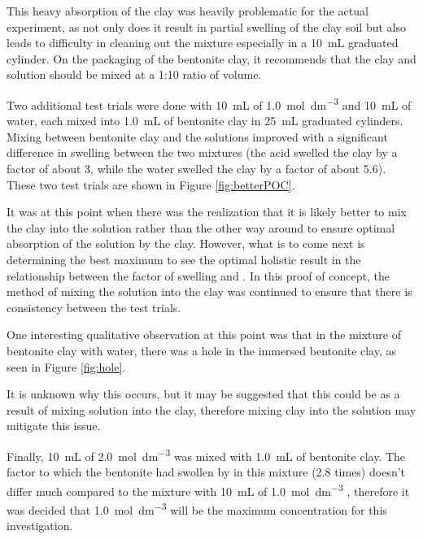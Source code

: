 \documentclass[11pt, letterpaper]{article}
\begin{document}
This heavy absorption of the clay was heavily problematic
for the actual experiment, as not only does it result in
partial swelling of the clay soil but also leads to difficulty
in cleaning out the mixture especially in a \SI{10}{mL} graduated
cylinder. On the packaging of the bentonite clay, it recommends
that the clay and solution should be mixed at a 1:10 ratio of volume.

Two additional test trials were done with \SI{10}{mL} of
\SI{1.0}{mol.dm^{-3}}  and \SI{10}{mL} of water,
each mixed into \SI{1.0}{mL} of bentonite clay in
\SI{25}{mL} graduated cylinders. Mixing between
bentonite clay and the solutions improved with a
significant difference in swelling between the two mixtures
(the acid swelled the clay by a factor of about 3, while
the water swelled the clay by a factor of about 5.6).
These two test trials are shown in Figure \ref*{fig:betterPOC}.

It was at this point when there was the realization that it
is likely better to mix the clay into the solution rather than
the other way around to ensure optimal absorption of the solution
by the clay. However, what is to come next is determining the
best maximum \ce{[H+]} to see the optimal holistic result
in the relationship between the factor of swelling and \ce{[H+]}.
In this proof of concept, the method of mixing the solution
into the clay was continued to ensure that there is consistency
between the test trials.

One interesting qualitative observation at this point was that
in the mixture of bentonite clay with water, there was a hole
in the immersed bentonite clay, as seen in Figure \ref*{fig:hole}.

It is unknown why this occurs, but it may be suggested that
this could be as a result of mixing solution into the clay,
therefore mixing clay into the solution may mitigate this issue.

Finally, \SI{10}{mL} of \SI{2.0}{mol.dm^{-3}} was mixed with \SI{1.0}{mL}
of bentonite clay. The factor to which the bentonite had swollen by
in this mixture (2.8 times) doesn't differ much compared to the
mixture with \SI{10}{mL} of \SI{1.0}{mol.dm^{-3}} , therefore
it was decided that \SI{1.0}{mol.dm^{-3}} will be the maximum
concentration for this investigation.
\end{document}
